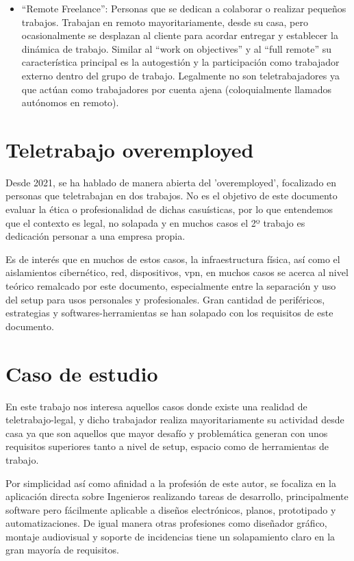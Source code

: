 \begin{itemize}
    \item “Remote Freelance”: Personas que se dedican a colaborar o realizar pequeños trabajos. Trabajan en remoto mayoritariamente, desde su casa, pero ocasionalmente se desplazan al cliente para acordar entregar y establecer la dinámica de trabajo. Similar al “work on objectives” y al “full remote” su característica principal es la autogestión y la participación como trabajador externo dentro del grupo de trabajo. Legalmente no son teletrabajadores ya que actúan como trabajadores por cuenta ajena (coloquialmente llamados autónomos en remoto).
    
\end{itemize}

\section{Teletrabajo overemployed}
Desde 2021, se ha hablado de manera abierta del 'overemployed', focalizado en personas que teletrabajan en dos trabajos. No es el objetivo de este documento evaluar la ética o profesionalidad de dichas casuísticas, por lo que entendemos que el contexto es legal, no solapada y en muchos casos el 2º trabajo es dedicación personar a una empresa propia.

Es de interés\cite{c_overemployed} que en muchos de estos casos, la infraestructura física, así como el aislamientos cibernético, red, dispositivos, vpn, en muchos casos se acerca al nivel teórico remalcado por este documento, especialmente entre la separación y uso del setup para usos personales y profesionales. Gran cantidad de periféricos, estrategias y softwares-herramientas se han solapado con los requisitos de este documento.



\section{Caso de estudio}
En este trabajo nos interesa aquellos casos donde existe una realidad de teletrabajo-legal, y dicho trabajador realiza mayoritariamente su actividad desde casa ya que son aquellos que mayor desafío y problemática generan con unos requisitos superiores tanto a nivel de setup, espacio como de herramientas de trabajo.

Por simplicidad así como afinidad a la profesión de este autor, se focaliza en la aplicación directa sobre Ingenieros realizando tareas de desarrollo, principalmente software pero fácilmente aplicable a diseños electrónicos, planos, prototipado y automatizaciones. De igual manera otras profesiones como diseñador gráfico, montaje audiovisual y soporte de incidencias tiene un solapamiento claro en la gran mayoría de requisitos.
